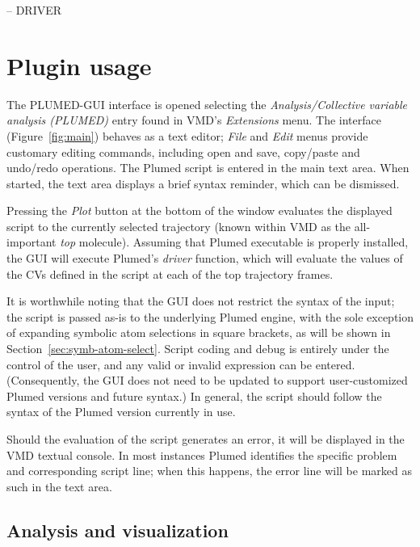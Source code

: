 \documentclass[preprint,12pt]{elsarticle}
\begin{document}
-- DRIVER


\section{Plugin usage}

The PLUMED-GUI interface is opened selecting the
\emph{Analysis/Collective variable analysis (PLUMED)} entry found in
VMD's \emph{Extensions} menu.  The interface (Figure~\ref{fig:main})
behaves  as a text editor; \emph{File} and \emph{Edit} menus
provide  customary editing commands, including  open and save,
copy/paste and undo/redo operations.  The Plumed script is entered in the main
text area.   When started, the text area displays a
brief syntax reminder, which can be dismissed. 

Pressing the \emph{Plot} button at the bottom of the window evaluates
the displayed script to the currently selected trajectory (known
within VMD as the all-important \emph{top} molecule). Assuming that
Plumed executable is properly installed, the GUI will execute Plumed's
\emph{driver} function, which will evaluate the values of the CVs
defined in the script at each of the top trajectory frames.


It is worthwhile noting that the GUI does not restrict the syntax of
the input; the script is passed as-is to the underlying Plumed engine,
with the sole exception of expanding symbolic atom selections in
square brackets, as will be shown in
Section~\ref{sec:symb-atom-select}.  Script coding and debug is
entirely under the control of the user, and any valid or invalid
expression can be entered.  (Consequently, the GUI does not need to be
updated to support user-customized Plumed versions and future syntax.)
In general, the script should follow the syntax of the Plumed version
currently in use.

Should the evaluation of the script generates an error, it will be
displayed in the VMD textual console.  In most instances Plumed
identifies the specific problem and corresponding script line; when this
happens, the error line will be marked as such
in the text area.



\subsection{Analysis and visualization}
\end{document}
